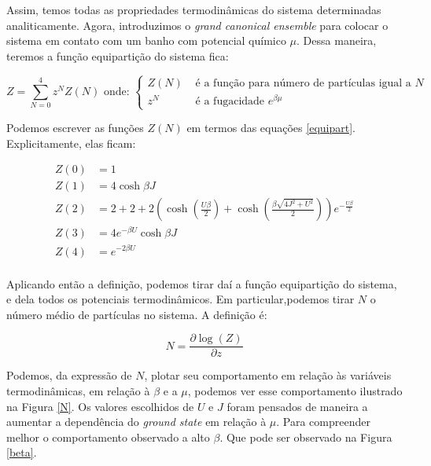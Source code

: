 Assim, temos todas as propriedades termodinâmicas do sistema determinadas analiticamente. Agora, introduzimos o \textit{grand canonical ensemble} para colocar o sistema em contato com um banho com potencial químico $\mu$. Dessa maneira, teremos a função equipartição do sistema fica:

\begin{equation}
Z = \sum_{N=0}^{4} z^N Z(N) \text{ onde: }
\begin{cases}
Z(N) & \text{ é a função para número de partículas igual a } N \\
z^N & \text{ é a fugacidade } e^{\beta \mu}
\end{cases}
\end{equation}

Podemos escrever as funções $Z(N)$ em termos das equações \eqref{equipart}. Explicitamente, elas ficam:

\begin{subequations}
\begin{align}
Z(0) &= 1 \\
Z(1) &= 4\cosh{\beta J} \\
Z(2) &= 2 + 2 + 2 \left(\cosh{\left (\frac{U \beta}{2} \right )} + \cosh{\left (\frac{\beta \sqrt{4 J^{2} + U^{2}}}{2} \right )}\right) e^{- \frac{U \beta}{2}} \\
Z(3) &= 4 e^{-\beta U} \cosh{\beta J} \\
Z(4) &= e^{-2\beta U} \\
\end{align}
\end{subequations}

Aplicando então a definição, podemos tirar daí a função equipartição do sistema, e dela todos os potenciais termodinâmicos. Em particular,podemos tirar $N$ o número médio de partículas no sistema. A definição é:

\begin{equation}
N = \frac{\partial \log(Z)}{\partial z}
\end{equation}

Podemos, da expressão de $N$, plotar seu comportamento em relação às variáveis termodinâmicas, em relação à $\beta$ e a $\mu$, podemos ver esse comportamento ilustrado na Figura \ref{N}. Os valores escolhidos de $U$ e $J$ foram pensados de maneira a aumentar a dependência do \textit{ground state} em relação à $\mu$. Para compreender melhor o comportamento observado a alto $\beta$. Que pode ser observado na Figura \ref{beta}.

